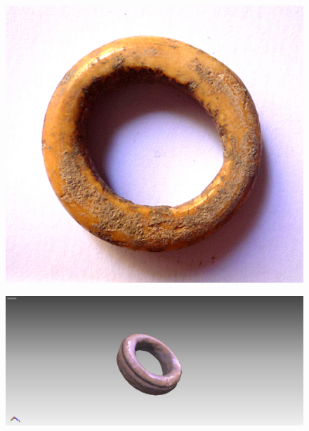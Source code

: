 \documentclass{beamer}
\begin{document}
		\begin{frame}
			\begin{multicols}{2}[][]
				\begin{figure}[]
					\begin{center}
						\includegraphics[width=1\linewidth]{snap3d/anello1}
					\end{center}
					\label{fig:anello1}
				\end{figure}
				\begin{figure}[]
					\begin{center}
						\includegraphics[width=1\linewidth,trim=200 0 200 0,clip=true]{snap3d/anello2}
					\end{center}
					\label{fig:anello2}
				\end{figure}
			\end{multicols}
		\end{frame}
\end{document}
